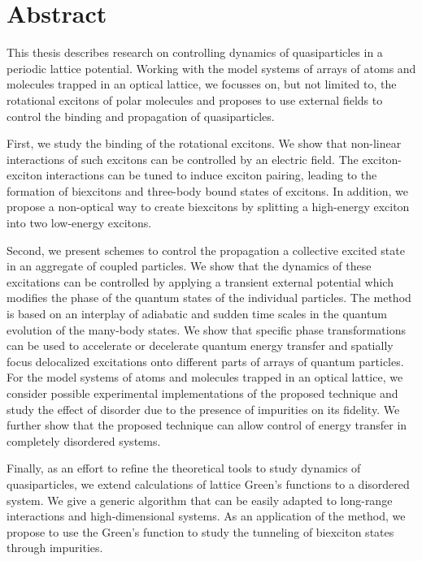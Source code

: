 
\chapter{Abstract}

This thesis describes research on controlling dynamics of quasiparticles in a
 periodic lattice potential. Working with the model systems of arrays of atoms and molecules trapped in an optical lattice, 
we focusses on, but not limited to, the rotational excitons of polar molecules and proposes to use external fields to 
control the binding and propagation of quasiparticles. 

First, we study the binding of the rotational excitons. We show that non-linear interactions of such excitons can
 be controlled by an electric field. The exciton-exciton interactions can be tuned
 to induce exciton pairing, leading to the formation of biexcitons and three-body bound states of excitons. In addition, we propose a non-optical way to create biexcitons by splitting a high-energy exciton into two 
low-energy excitons. 

Second, we present schemes to control the propagation a collective
 excited state in an aggregate of coupled particles. We show that the dynamics of these excitations can be controlled by
 applying a transient external potential which modifies the phase of the quantum
 states of the individual particles. The method is based on an interplay of adiabatic
 and sudden time scales in the quantum evolution of the many-body states. We show
 that specific phase transformations can be used to accelerate or decelerate quantum
 energy transfer and spatially focus delocalized excitations onto different parts of
arrays of quantum particles. For the model systems of atoms and molecules trapped in an optical lattice, we consider possible experimental implementations
 of the proposed technique and study the effect of disorder due to the presence of
 impurities on its fidelity. We further show that the proposed technique can allow
 control of energy transfer in completely disordered systems.
 

Finally, as an effort to refine the theoretical tools to study dynamics of quasiparticles, we extend calculations of lattice 
Green's functions to a disordered system. We give a generic algorithm that can 
be easily adapted to long-range interactions and high-dimensional systems. As an application of the method, we propose 
to use the Green’s function to study the tunneling of biexciton states through
 impurities.


